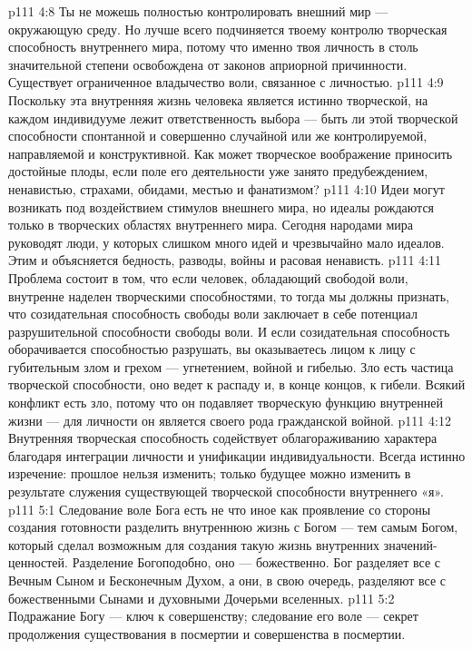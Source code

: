 \vs p111 4:8 \pc Ты не можешь полностью контролировать внешний мир --- окружающую среду. Но лучше всего подчиняется твоему контролю творческая способность внутреннего мира, потому что именно твоя личность в столь значительной степени освобождена от законов априорной причинности. Существует ограниченное владычество воли, связанное с личностью.
\vs p111 4:9 Поскольку эта внутренняя жизнь человека является истинно творческой, на каждом индивидууме лежит ответственность выбора --- быть ли этой творческой способности спонтанной и совершенно случайной или же контролируемой, направляемой и конструктивной. Как может творческое воображение приносить достойные плоды, если поле его деятельности уже занято предубеждением, ненавистью, страхами, обидами, местью и фанатизмом?
\vs p111 4:10 Идеи могут возникать под воздействием стимулов внешнего мира, но идеалы рождаются только в творческих областях внутреннего мира. Сегодня народами мира руководят люди, у которых слишком много идей и чрезвычайно мало идеалов. Этим и объясняется бедность, разводы, войны и расовая ненависть.
\vs p111 4:11 Проблема состоит в том, что если человек, обладающий свободой воли, внутренне наделен творческими способностями, то тогда мы должны признать, что созидательная способность свободы воли заключает в себе потенциал разрушительной способности свободы воли. И если созидательная способность оборачивается способностью разрушать, вы оказываетесь лицом к лицу с губительным злом и грехом --- угнетением, войной и гибелью. Зло есть частица творческой способности, оно ведет к распаду и, в конце концов, к гибели. Всякий конфликт есть зло, потому что он подавляет творческую функцию внутренней жизни --- для личности он является своего рода гражданской войной.
\vs p111 4:12 \pc Внутренняя творческая способность содействует облагораживанию характера благодаря интеграции личности и унификации индивидуальности. Всегда истинно изречение: прошлое нельзя изменить; только будущее можно изменить в результате служения существующей творческой способности внутреннего «я».
\vs p111 5:1 Следование воле Бога есть не что иное как проявление со стороны создания готовности разделить внутреннюю жизнь с Богом --- тем самым Богом, который сделал возможным для создания такую жизнь внутренних значений\hyp{}ценностей. Разделение Богоподобно, оно --- божественно. Бог разделяет все с Вечным Сыном и Бесконечным Духом, а они, в свою очередь, разделяют все с божественными Сынами и духовными Дочерьми вселенных.
\vs p111 5:2 Подражание Богу --- ключ к совершенству; следование его воле --- секрет продолжения существования в посмертии и совершенства в посмертии.
